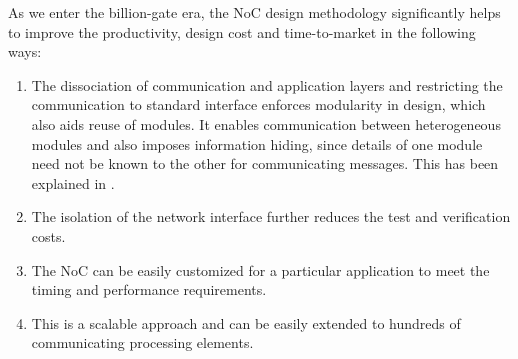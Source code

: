 \hspace{5mm}As we enter the billion-gate era, the NoC design methodology significantly helps to improve the productivity, design cost and time-to-market in the following ways:
\begin{enumerate} 
	\item{The dissociation of communication and application layers and restricting the communication to standard interface enforces modularity in design, which also aids reuse of modules. It enables communication between heterogeneous modules and also imposes information hiding, since details of one module need not be known to the other for communicating messages. This has been explained in \cite{4550897}.}
	\item{The isolation of the network interface further reduces the test and verification costs.}
	\item{The NoC can be easily customized for a particular application to meet the timing and performance requirements.}
	\item{This is a scalable approach and can be easily extended to hundreds of communicating processing elements.}
\end{enumerate}

